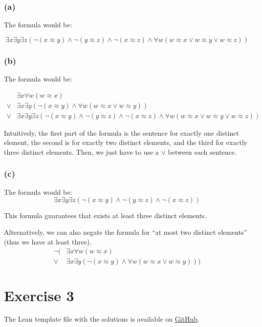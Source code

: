 \documentclass[11pt]{article}
\begin{document}
\subsubsection*{(a)} 
The formula would be:

$$\exists x \exists y \exists z (\lnot (x \approx y) \land \lnot (y \approx z) \land \lnot (x \approx z) \land \forall w (w \approx x \lor w \approx y \lor w \approx z))$$

\subsubsection*{(b)}
The formula would be:

\begin{align*}
    & \exists x \forall w (w \approx x)\\
    \lor &  \exists x \exists y (\lnot (x \approx y) \land \forall w (w \approx x \lor w \approx y)) \\
    \lor & \exists x \exists y \exists z (\lnot (x \approx y) \land \lnot (y \approx z) \land \lnot (x \approx z) \land \forall w (w \approx x \lor w \approx y \lor w \approx z))
\end{align*}

Intuitively, the first part of the formula is the sentence for exactly one distinct element, the second is for exactly two distinct elements, and the third for exactly three distinct elements. Then, we just have to use a $\lor$ between each sentence.

\subsubsection*{(c)}

The formula would be:
$$\exists x \exists y \exists z (\lnot (x \approx y) \land \lnot (y \approx z) \land \lnot (x \approx z))$$

This formula guarantees that exists at least three distinct elements. 

Alternatively, we can also negate the formula for ``at most two distinct elements'' (thus we have at least three).
\begin{align*}
    \lnot( & \exists x \forall w (w \approx x) \\
    \lor &  \exists x \exists y (\lnot (x \approx y) \land \forall w (w \approx x \lor w \approx y)))
\end{align*}




\section*{Exercise 3}
The Lean template file with the solutions is available on \href{https://github.com/lucastassis/BU-CS511/blob/main/HW08/code/HW08.lean}{GitHub}.
\end{document}
